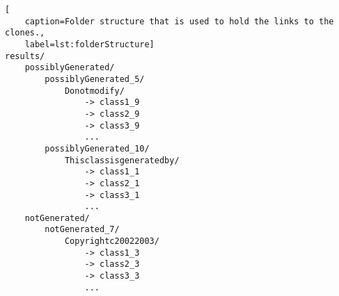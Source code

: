 
\begin{lstlisting}[
	caption=Folder structure that is used to hold the links to the clones.,
	label=lst:folderStructure]	
results/
	possiblyGenerated/
		possiblyGenerated_5/
			Donotmodify/
				-> class1_9
				-> class2_9
				-> class3_9
				...
		possiblyGenerated_10/
			Thisclassisgeneratedby/
				-> class1_1
				-> class2_1
				-> class3_1
				...
	notGenerated/
		notGenerated_7/
			Copyrightc20022003/
				-> class1_3
				-> class2_3
				-> class3_3
				...
\end{lstlisting}